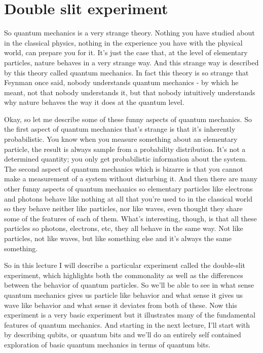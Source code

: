 \documentclass{article}
\title{}
\date{}
\newcommand{\<}{\langle}
\renewcommand{\>}{\rangle}
\begin{document}
\maketitle

\section{Double slit experiment}


So quantum mechanics is a very strange theory. Nothing you have studied about in the classical physics, nothing in the experience you have with the physical world, can prepare you for it. It's just the case that, at the level of elementary particles, nature behaves in a very strange way. And this strange way is described by this theory called quantum mechanics. In fact this theory is so strange that Feynman once said, nobody understands quantum mechanics - by which he meant, not that nobody understands it, but that nobody intuitively understands why nature behaves the way it does at the quantum level. 

Okay, so let me describe some of these funny aspects of quantum mechanics. So the first aspect of quantum mechanics that's strange is that it's inherently probabilistic. You know when you measure something about an elementary particle, the result is always sample from a probability distribution. It's not a determined quantity; you only get probabilistic information about the system. The second aspect of quantum mechanics which is bizarre is that you cannot make a measurement of a system without disturbing it. And then there are many other funny aspects of quantum mechanics so elementary particles like electrons and photons behave like nothing at all that you're used to in the classical world so they behave neither like particles, nor like waves, even thought they share some of the features of each of them. What's interesting, though, is that all these particles so photons, electrons, etc, they all behave in the same way. Not like particles, not like waves, but like something else and it's always the same something. 

So in this lecture I will describe a particular experiment called the double-slit experiment, which highlights both the commonality as well as the differences between the behavior of quantum particles. So we'll be able to see in what sense quantum mechanics gives us particle like behavior and what sense it gives us wave like behavior and what sense it deviates from both of these. Now this experiment is a very basic experiment but it illustrates many of the fundamental features of quantum mechanics. And starting in the next lecture, I'll start with by describing qubits, or quantum bits and we'll do an entirely self contained exploration of basic quantum mechanics in terms of quantum bits. 
\end{document}
